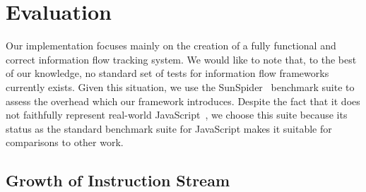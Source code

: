 

\section{Evaluation}
\label{sec:evaluation}

%

Our implementation focuses mainly on the creation of a fully functional and correct information flow tracking system.
We would like to note that, to the best of our knowledge, no standard set of tests for information flow frameworks currently exists.
Given this situation, we use the SunSpider~\cite{sunspider} benchmark suite to assess the overhead which our framework introduces.
Despite the fact that it does not faithfully represent real-world JavaScript~\cite{jsmeter}, we choose this suite because its status as the standard benchmark suite for JavaScript makes it suitable for comparisons to other work.

\subsection{Growth of Instruction Stream}


